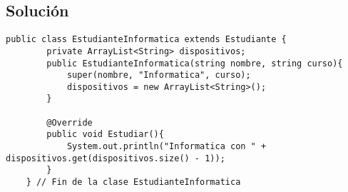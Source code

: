 \documentclass[a4paper,12pt]{article}
\begin{document}













\subsection{Solución}

\begin{lstlisting}[style=customjava, caption={Clase Estudiante de Informática}]
    public class EstudianteInformatica extends Estudiante {
        private ArrayList<String> dispositivos;
        public EstudianteInformatica(string nombre, string curso){
            super(nombre, "Informatica", curso);
            dispositivos = new ArrayList<String>();
        }

        @Override
        public void Estudiar(){
            System.out.println("Informatica con " + dispositivos.get(dispositivos.size() - 1));
        }
    } // Fin de la clase EstudianteInformatica
    
\end{lstlisting}
\end{document}
